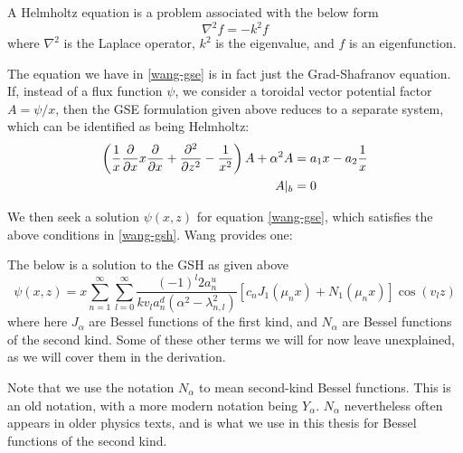 \begin{definition}
    A Helmholtz equation is a problem associated with the below form
    $$\nabla^2 f = -k^2 f$$
    where $\nabla^2$ is the Laplace operator, $k^2$ is the eigenvalue, and $f$ is an eigenfunction.
\end{definition}
The equation we have in \ref{wang-gse} is in fact just the Grad-Shafranov equation. If, instead of a flux function $\psi$, we consider 
a toroidal vector potential factor $A = \psi / x$, then the GSE formulation given above reduces to a separate system, which can be identified 
as being Helmholtz:
\begin{align}
    \label{wang-gsh} \left ( \frac{1}{x} \pdv{x} x \pdv{x} + \pdv[2]{z} - \frac{1}{x^2} \right ) A + \alpha^2 A &= a_1 x - a_2 \frac{1}{x} \\
    A |_b &= 0
\end{align}

We then seek a solution $\psi(x,z)$ for equation \ref{wang-gse}, which satisfies the above conditions in \ref{wang-gsh}. Wang provides one:
\begin{proposition}
    The below is a solution to the GSH as given above
    \begin{equation}
        \label{gsh-solution} \psi(x,z) = x \sum_{n = 1}^{\infty} \sum_{l = 0}^{\infty} \frac{(-1)^l 2 a_n^u}{kv_la_n^d (\alpha^2 - \lambda_{n,l}^2)} \left [ c_n J_1(\mu_n x) + N_1(\mu_n x)\right ] \cos(v_l z)
    \end{equation}
    where here $J_\alpha$ are Bessel functions of the first kind, and $N_\alpha$ are Bessel functions of the second kind. Some of these other terms we will for now 
    leave unexplained, as we will cover them in the derivation.
\end{proposition}

\begin{notn}
    Note that we use the notation $N_\alpha$ to mean second-kind Bessel functions. This is an old notation, 
    with a more modern notation being $Y_\alpha$. $N_\alpha$ nevertheless often appears in older physics texts, and is what we use in this thesis for Bessel functions of the second kind.
\end{notn}

